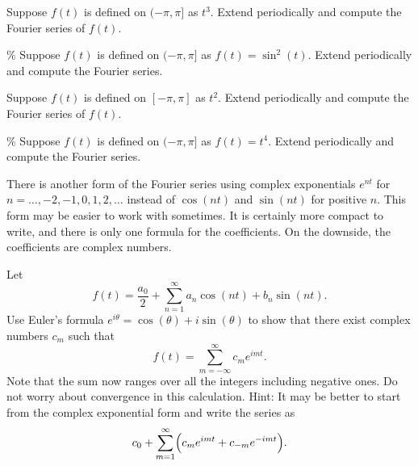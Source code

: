 \documentclass{ximera}
\begin{document}
\begin{exercise}
    Suppose $f(t)$ is defined on $(-\pi,\pi]$ as $t^3$. Extend periodically and compute the Fourier series of $f(t)$.
\end{exercise}

\begin{exercise}\%
    Suppose $f(t)$ is defined on $(-\pi,\pi]$ as $f(t) = \sin^2(t)$. Extend periodically and compute the Fourier series.
\end{exercise}

\begin{exercise}
    Suppose $f(t)$ is defined on $[-\pi,\pi]$ as $t^2$. Extend periodically and compute the Fourier series of $f(t)$.
\end{exercise}

\begin{exercise}\%
    Suppose $f(t)$ is defined on $(-\pi,\pi]$ as $f(t) = t^4$. Extend periodically and compute the Fourier series.
\end{exercise}

There is another form of the Fourier series using complex exponentials $e^{nt}$ for $n=\ldots,-2,-1,0,1,2,\ldots$ instead of $\cos(nt)$ and $\sin(nt)$ for positive $n$.  This form may be easier to work with sometimes.  It is certainly more compact to write, and there is only one formula for the coefficients.  On the downside, the coefficients are complex numbers.

\begin{exercise}
    Let 
    \begin{equation*}
        f(t) = \frac{a_0}{2} + \sum_{n=1}^\infty a_n \cos (n t) + b_n \sin (n t) .
    \end{equation*}
    Use Euler's formula $e^{i\theta} = \cos (\theta) + i \sin (\theta)$ to show that there exist complex numbers $c_m$ such that
    \begin{equation*}
    f(t) = \sum_{m=-\infty}^\infty c_m e^{imt} .
    \end{equation*}
    Note that the sum now ranges over all the integers including negative ones. Do not worry about convergence in this calculation. Hint: It may be better to start from the complex exponential form and write the series as
    \begin{equation*}
        c_0 + \sum_{m=1}^\infty \Bigl( c_m e^{imt} + c_{-m} e^{-imt}  \Bigr).
    \end{equation*}
\end{exercise}

\end{document}
